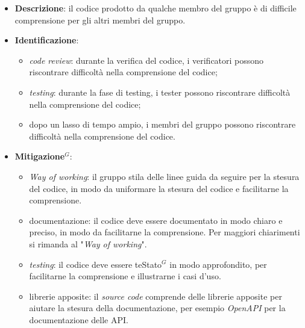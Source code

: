 \label{risk:codice incomprensibile}
\begin{itemize}
	\item \textbf{Descrizione}: il codice prodotto da qualche membro del gruppo
	      è di difficile comprensione per gli altri membri del gruppo.
	\item \textbf{Identificazione}:
	      \begin{itemize}
		      \item \textit{code review}: durante la verifica del codice, i
		            verificatori possono riscontrare difficoltà nella comprensione
		            del codice;

		      \item \textit{testing}: durante la fase di testing, i tester possono
		            riscontrare difficoltà nella comprensione del codice;

		      \item dopo un lasso di tempo ampio, i membri del gruppo possono
		            riscontrare difficoltà nella comprensione del codice.
	      \end{itemize}
	\item \textbf{\gls{Mitigazione}$^G$}:
	      \begin{itemize}
		      \item \textit{Way of working}: il gruppo stila delle linee guida
		            da seguire per la stesura del codice, in modo da uniformare
		            la stesura del codice e facilitarne la comprensione.

		      \item documentazione: il codice deve essere documentato in modo
		            chiaro e preciso, in modo da facilitarne la comprensione. Per
		            maggiori chiarimenti si rimanda al "\textit{Way of working}".

		      \item \textit{testing}: il codice deve essere te\gls{Stato}$^G$ in modo
		            approfondito, per facilitarne la comprensione e illustrarne
		            i casi d'uso.

		      \item librerie apposite: il \textit{source code} comprende delle
		            librerie apposite per aiutare la stesura della
		            documentazione, per esempio \textit{OpenAPI} per la
		            documentazione delle API.
	      \end{itemize}
\end{itemize}
